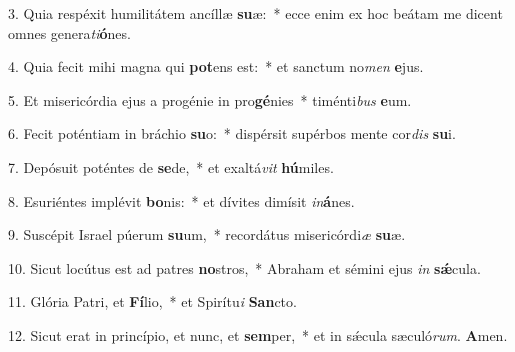 \item 3. Quia respéxit humilitátem ancíllæ \textbf{su}æ:~* ecce enim ex hoc beátam me dicent omnes genera\hspace{0.03em}\textit{ti}\textbf{ó}nes.

\item 4. Quia fecit mihi magna qui \textbf{pot}ens est:~* et sanctum no\textit{men} \textbf{e}jus.

\item 5. Et misericórdia ejus a progénie in pro\textbf{gé}nies~* timénti\textit{bus} \textbf{e}um.

\item 6. Fecit poténtiam in bráchio \textbf{su}o:~* dispérsit supérbos mente cor\textit{dis} \textbf{su}i.

\item 7. Depósuit poténtes de \textbf{se}de,~* et exaltá\textit{vit} \textbf{hú}miles.

\item 8. Esuriéntes implévit \textbf{bo}nis:~* et dívites dimísit \textit{in}\textbf{á}nes.

\item 9. Suscépit Israel púerum \textbf{su}um,~* recordátus misericórdi\hspace{0.03em}\textit{æ} \textbf{su}æ.

\item 10. Sicut locútus est ad patres \textbf{no}stros,~* Abraham et sémini ejus \textit{in} \textbf{sǽ}cula.

\item 11. Glória Patri, et \textbf{Fí}lio,~* et Spirítu\hspace{0.03em}\textit{i} \textbf{San}cto.

\item 12. Sicut erat in princípio, et nunc, et \textbf{sem}per,~* et in sǽcula sæculó\textit{rum}. \textbf{A}men.
